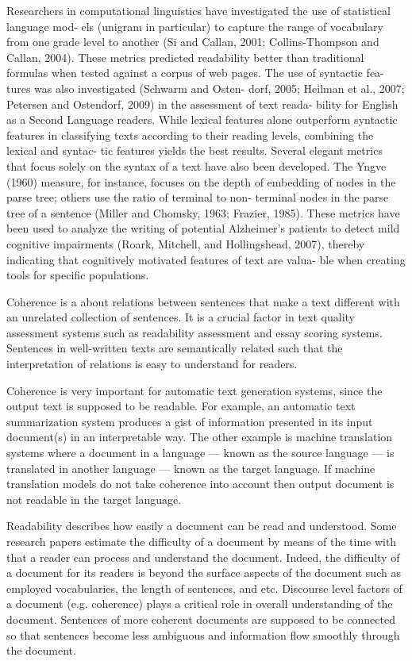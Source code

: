 Researchers in computational linguistics have investigated the use of statistical language mod- els (unigram in particular) to capture the range of vocabulary from one grade level to another (Si and Callan, 2001; Collins-Thompson and Callan, 2004). These metrics predicted readability better than traditional formulas when tested against a corpus of web pages. The use of syntactic fea- tures was also investigated (Schwarm and Osten- dorf, 2005; Heilman et al., 2007; Petersen and Ostendorf, 2009) in the assessment of text reada- bility for English as a Second Language readers. While lexical features alone outperform syntactic features in classifying texts according to their reading levels, combining the lexical and syntac- tic features yields the best results.
Several elegant metrics that focus solely on the syntax of a text have also been developed. The Yngve (1960) measure, for instance, focuses on the depth of embedding of nodes in the parse tree; others use the ratio of terminal to non- terminal nodes in the parse tree of a sentence (Miller and Chomsky, 1963; Frazier, 1985). These metrics have been used to analyze the writing of potential Alzheimer's patients to detect mild cognitive impairments (Roark, Mitchell, and Hollingshead, 2007), thereby indicating that cognitively motivated features of text are valua- ble when creating tools for specific populations. 


Coherence is a about relations between sentences that make a text different with an unrelated collection of sentences. 
It is a crucial factor in text quality assessment systems such as readability assessment and essay scoring systems.  
Sentences in well-written texts are semantically related such that the interpretation of  relations is easy to understand for readers.  

Coherence is very important for automatic text generation systems, since the output text is supposed to be readable. 
For example, an automatic text summarization system produces a gist of information presented in its input document(s) in an interpretable way. 
The other example is machine translation systems where a document in a language --- known as the source language --- is translated in another language --- known as the target language. 
If machine translation models do not take coherence into account then output document is not readable in the target language.   

Readability describes how easily a document can be read and understood. 
Some research papers \cite{} estimate the difficulty of a document by means of the time with that a reader can process and understand the document. 
Indeed, the difficulty of a document for its readers is beyond the surface aspects of the document such as employed vocabularies, the length of sentences, and etc. 
Discourse level factors of a document (e.g. coherence) plays a critical role in overall understanding of the document. 
Sentences of more coherent documents are supposed to be connected so that sentences become less ambiguous and information flow smoothly through the document. 

